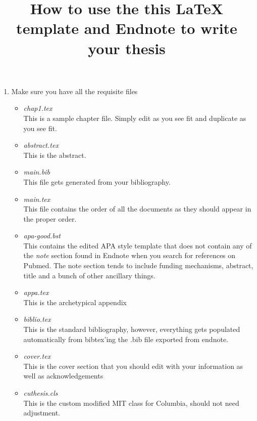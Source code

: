 \documentclass[11pt]{amsart}
\title{How to use the this {\LaTeX} template and Endnote to write your thesis}
\begin{document}
\maketitle

\begin{enumerate}
\item Make sure you have all the requisite files
\begin{itemize}
\item \textit{chap1.tex}\\
This is a sample chapter file. Simply edit as you see fit and duplicate as you see fit. 
\item \textit{abstract.tex}\\
This is the abstract. 
\item \textit{main.bib}\\
This file gets generated from your bibliography.
\item \textit{main.tex}\\
This file contains the order of all the documents as they should appear in the proper order. 
\item \textit{apa-good.bst}\\
This contains the edited APA style template that does not contain any of the \textit{note} section found in Endnote when you search for references on Pubmed. The note section tends to include funding mechanisms, abstract, title and a bunch of other ancillary things. 
\item \textit{appa.tex}\\
This is the archetypical appendix
\item \textit{biblio.tex}\\
This is the standard bibliography, however, everything gets populated automatically from bibtex'ing the .bib file exported from endnote.
\item \textit{cover.tex}\\
This is the cover section that you should edit with your information as well as acknowledgements
\item \textit{cuthesis.cls}\\
This is the custom modified MIT class for Columbia, should not need adjustment.

\end{itemize}
\end{enumerate}
\end{document}
